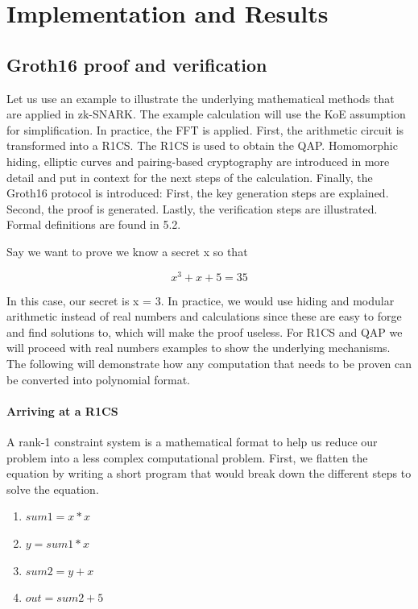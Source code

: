 \chapter{Implementation and Results}
\section{Groth16 proof and verification}
Let us use an example to illustrate the underlying mathematical methods that are applied in zk-SNARK. The example calculation will use the KoE assumption for simplification. In practice, the FFT is applied. First, the arithmetic circuit is transformed into a R1CS. The R1CS is used to obtain the QAP. Homomorphic hiding, elliptic curves and pairing-based cryptography are introduced in more detail and put in context for the next steps of the calculation. Finally, the Groth16 protocol is introduced: First, the key generation steps are explained. Second, the proof is generated. Lastly, the verification steps are illustrated. Formal definitions are found in 5.2.

Say we want to prove we know a secret x so that

\[x^3 + x + 5 = 35\]

In this case, our secret is x = 3.
In practice, we would use hiding and modular arithmetic instead of real numbers and calculations since these are easy to forge and find solutions to, which will make the proof useless. For R1CS and QAP we will proceed with real numbers examples to show the underlying mechanisms. The following will demonstrate how any computation that needs to be proven can be converted into polynomial format.

\subsubsection{Arriving at a R1CS}

A rank-1 constraint system is a mathematical format to help us reduce our problem into a less complex computational problem. First, we flatten the equation by writing a short program that would break down the different steps to solve the equation.

\begin{enumerate}
    \item \(sum1 = x * x\)
    \item \(y = sum1 * x\)
    \item \(sum2 = y + x\)
    \item \(out = sum2 + 5\)
\end{enumerate}

